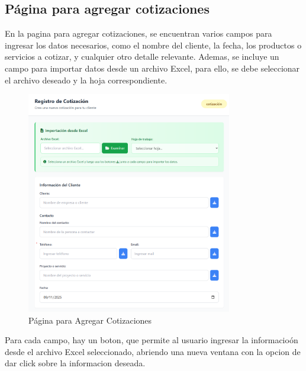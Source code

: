 \documentclass{Pretexto/bluereport}
\begin{document}
\subsection{Página para agregar cotizaciones}

En la pagina para agregar cotizaciones, se encuentran varios campos para ingresar los datos necesarios, como el nombre del cliente, la fecha, los productos o servicios a cotizar, y cualquier otro detalle relevante.
Ademas, se incluye un campo para importar datos desde un archivo Excel, para ello, se debe seleccionar el archivo deseado y la hoja correspondiente.

\begin{figure}[H]
    \centering
    \includegraphics[width=0.8\textwidth]{img/agregar_cotizacion_pagina.png}
    \caption{Página para Agregar Cotizaciones}
    \label{fig:agregar_cotizacion_pagina}
\end{figure}

Para cada campo, hay un boton, que permite al usuario ingresar la informacioón desde el archivo Excel seleccionado, abriendo una nueva ventana con la opcion de dar click sobre la informacion deseada.
\end{document}
